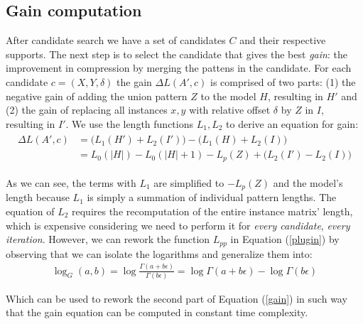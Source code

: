 \documentclass{llncs}
\begin{document}
\subsection{Gain computation}

After candidate search we have a set of candidates $C$ and their respective supports. The next step is to select the candidate that gives the best \emph{gain}: the improvement in compression by merging the pattens in the candidate. For each candidate $c=(X,Y,\delta)$ the gain $\Delta L(A',c)$  is comprised of two parts: (1) the negative gain of adding the union pattern $Z$ to the model $H$, resulting in $H'$ and (2) the gain of replacing all instances $x,y$ with relative offset $\delta$ by $Z$ in $I$, resulting in $I'$. We use the length functions $L_1, L_2$ to derive an equation for gain:
\begin{align}
\label{gain}
\begin{split}
	\Delta L(A',c) &= \Big(L_1(H') + L_2(I') \Big) - \Big(L_1(H) + L_2(I) \Big) \\
			    &= L_0(|H|) - L_0(|H|+1) - L_p(Z) + \Big(L_2(I') - L_2(I) \Big)
\end{split}
\end{align}

As we can see, the terms with $L_1$ are simplified to $- L_p(Z)$ and the model's length because $L_1$ is simply a summation of individual pattern lengths. The equation of $L_2$ requires the recomputation of the entire instance matrix' length, which is expensive considering we need to perform it for \emph{every candidate}, \emph{every iteration}. However, we can rework the function $L_{pp}$ in Equation (\ref{plugin}) by observing that we can isolate the logarithms and generalize them into:
\begin{align}
	\log_G(a,b) = \log \frac{\Gamma(a+ b\epsilon)}{\Gamma(b\epsilon)} = \log \Gamma(a+ b\epsilon) - \log \Gamma(b\epsilon)
\end{align} 

\noindent Which can be used to rework the second part of Equation (\ref{gain}) in such way that the gain equation can be computed in constant time complexity.
\end{document}
